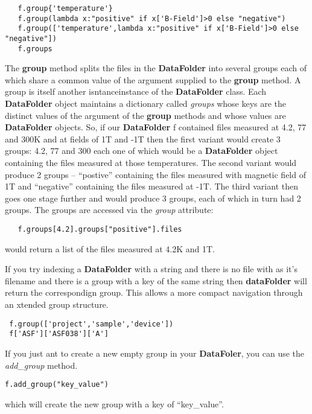 \documentclass[a4paper,11pt]{scrartcl}
\begin{document}
\begin{lstlisting}
   f.group{'temperature'}
   f.group(lambda x:"positive" if x['B-Field']>0 else "negative")
   f.group(['temperature',lambda x:"positive" if x['B-Field']>0 else "negative"])
   f.groups
\end{lstlisting}

The \textbf{group} method splits the files in the \textbf{DataFolder} into several groups each of which share a common value of the argument supplied to the \textbf{group} method. A group is itself another isntanceinstance of the \textbf{DataFolder} class. Each \textbf{DataFolder} object maintains a dictionary called \textit{groups} whose keys are the distinct values of the argument of the \textbf{group} methods and whose values are \textbf{DataFolder} objects. So, if our \textbf{DataFolder} f contained files measured at 4.2, 77 and 300K and at fields of 1T and -1T then the first variant would create 3 groups: 4.2, 77 and 300 each one of which would be a \textbf{DataFolder} object containing the files measured at those temperatures. The second variant would produce 2 groups -- ``postive'' containing the files measured with magnetic field of 1T and ``negative'' containing the files measured at -1T. The third variant then goes one stage further and would produce 3 groups, each of which in turn had 2 groups. The groups are accessed via the \textit{group} attribute:

\begin{lstlisting}
   f.groups[4.2].groups["positive"].files
\end{lstlisting}

would return a list of the files measured at 4.2K and 1T.

If you try indexing a \textbf{DataFolder} with a string and there is no file with as it's filename and there is a group with a key of the same string then \textbf{dataFolder} will return the correspondign group. This allows a more compact navigation through an xtended group structure.

\begin{lstlisting}
 f.group(['project','sample','device'])
 f['ASF']['ASF038']['A']
\end{lstlisting}

If you just ant to create a new empty group in your \textbf{DataFoler}, you can use the \textit{add\_group} method.
\begin{lstlisting}
f.add_group("key_value")
\end{lstlisting}
which will create the new group with a key of ``key\_value''.
\end{document}
